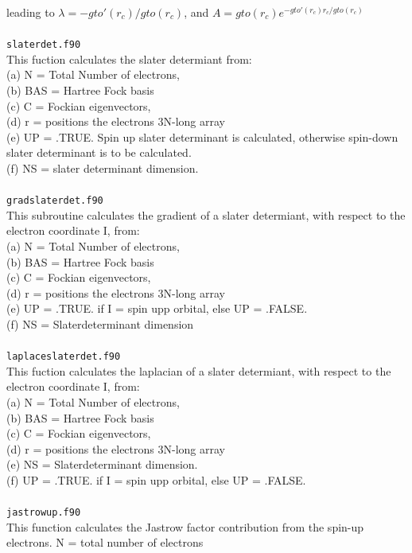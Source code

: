 \documentclass[a4paper,twoside,openany]{book}
\begin{document}
{{leading to $\lambda = - gto'(r_{c})/gto(r_{c})$, and $A = gto(r_{c})e^{-gto'(r_{c})r_{c}/gto(r_{c})}$ \\ \\
\texttt{slaterdet.f90}\\
This fuction calculates the slater determiant from:\\
(a) N = Total Number of electrons, \\
(b) BAS = Hartree Fock basis \\
(c) C = Fockian eigenvectors, \\
(d) r = positions the electrons 3N-long array \\
(e) UP = .TRUE. Spin up slater determinant is calculated, otherwise spin-down slater determinant is to be calculated. \\
(f) NS = slater determinant dimension. \\ \\
\texttt{gradslaterdet.f90}\\
This subroutine calculates the gradient of a slater determiant, with 
respect to the electron coordinate I, from: \\
(a) N = Total Number of electrons,\\
 (b) BAS = Hartree Fock basis\\
(c) C = Fockian eigenvectors, \\
(d) r = positions the electrons 3N-long array \\ 
(e) UP = .TRUE. if I = spin upp orbital, else UP = .FALSE. \\
(f) NS = Slaterdeterminant dimension \\ \\
\texttt{laplaceslaterdet.f90}\\
This fuction calculates the laplacian of a slater determiant, with 
respect to the electron coordinate I, from: \\
(a) N = Total Number of electrons, \\
(b) BAS = Hartree Fock basis \\
(c) C = Fockian eigenvectors, \\
(d) r = positions the electrons 3N-long array \\
(e) NS = Slaterdeterminant dimension.\\
(f) UP = .TRUE. if I = spin upp orbital, else UP = .FALSE. \\ \\
\texttt{jastrowup.f90}\\
This function calculates the Jastrow factor contribution
from the spin-up electrons. N = total number of electrons
}}
\end{document}
